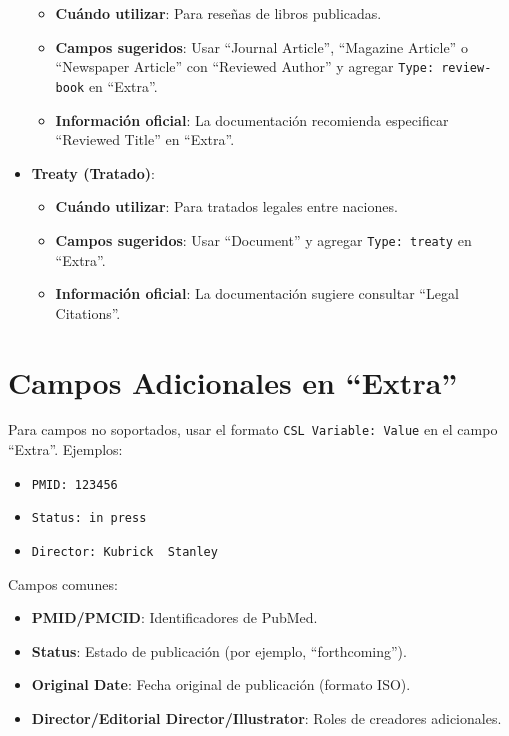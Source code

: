 \documentclass[
  jou,
  floatsintext,
  longtable,
  a4paper,
  nolmodern,
  notxfonts,
  notimes,
  colorlinks=true,linkcolor=blue,citecolor=blue,urlcolor=blue]{apa7}
\providecommand{\tightlist}{%
  \setlength{\itemsep}{0pt}\setlength{\parskip}{0pt}}
\begin{document}
\begin{itemize}
  \begin{itemize}
  \tightlist
  \item
    \textbf{Cuándo utilizar}: Para reseñas de libros publicadas.
  \item
    \textbf{Campos sugeridos}: Usar ``Journal Article'', ``Magazine
    Article'' o ``Newspaper Article'' con ``Reviewed Author'' y agregar
    \texttt{Type:\ review-book} en ``Extra''.
  \item
    \textbf{Información oficial}: La documentación recomienda
    especificar ``Reviewed Title'' en ``Extra''.
  \end{itemize}
\item
  \textbf{Treaty (Tratado)}:

  \begin{itemize}
  \tightlist
  \item
    \textbf{Cuándo utilizar}: Para tratados legales entre naciones.
  \item
    \textbf{Campos sugeridos}: Usar ``Document'' y agregar
    \texttt{Type:\ treaty} en ``Extra''.
  \item
    \textbf{Información oficial}: La documentación sugiere consultar
    ``Legal Citations''.
  \end{itemize}
\end{itemize}

\section{Campos Adicionales en
``Extra''}\label{campos-adicionales-en-extra}

Para campos no soportados, usar el formato
\texttt{CSL\ Variable:\ Value} en el campo ``Extra''. Ejemplos:

\begin{itemize}
\tightlist
\item
  \texttt{PMID:\ 123456}
\item
  \texttt{Status:\ in\ press}
\item
  \texttt{Director:\ Kubrick\ \textbar{}\textbar{}\ Stanley}
\end{itemize}

Campos comunes:

\begin{itemize}
\tightlist
\item
  \textbf{PMID/PMCID}: Identificadores de PubMed.
\item
  \textbf{Status}: Estado de publicación (por ejemplo, ``forthcoming'').
\item
  \textbf{Original Date}: Fecha original de publicación (formato ISO).
\item
  \textbf{Director/Editorial Director/Illustrator}: Roles de creadores
  adicionales.
\end{itemize}
\end{document}
